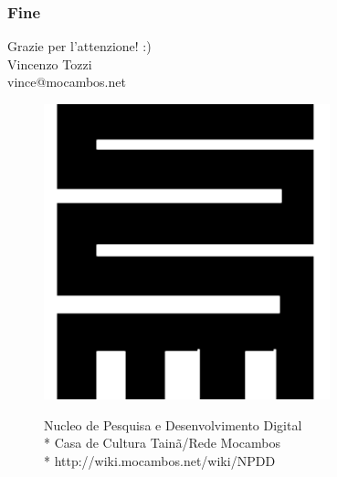 \documentclass{beamer}
\begin{document}
\begin{frame}
 \frametitle{Fine}
 \begin{center}
   \huge Grazie per l'attenzione! :) \\
   \vfill
   \large  
   Vincenzo Tozzi \\
   \normalsize
   vince@mocambos.net
   \vfill
   \begin{figure}[htb]
     \begin{minipage}[c]{0.10\textwidth}
       \includegraphics[width=\textwidth]{./Figure/NPDD.pdf}
  \end{minipage}
  \begin{minipage}[c]{0.60\textwidth}
    \footnotesize
    Nucleo de Pesquisa e Desenvolvimento Digital \\*
    Casa de Cultura Tainã/Rede Mocambos\\*
    http://wiki.mocambos.net/wiki/NPDD
  \end{minipage}

\end{figure}
\end{center}
\end{frame}
\end{document}
